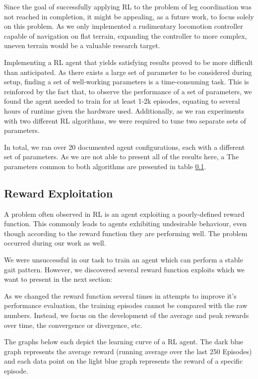 Since the goal of successfully applying RL to the problem of leg coordination was not reached in completion, it might be appealing, as a future work, to focus solely on this problem.
As we only implemented a rudimentary locomotion controller capable of navigation on flat terrain, expanding the controller to more complex, uneven terrain would be a valuable research target.

Implementing a RL agent that yields satisfying results proved to be more difficult than anticipated.
As there exists a large set of parameter to be considered during setup, finding a set of well-working parameters is a time-consuming task.
This is reinforced by the fact that, to observe the performance of a set of parameters, we found the agent needed to train for at least 1-2k episodes, equating to several hours of runtime given the hardware used.
Additionally, as we ran experiments with two different RL algorithms, we were required to tune two separate sets of parameters.

In total, we ran over 20 documented agent configurations, each with a different set of parameters.
As we are not able to present all of the results here, a 
The parameters common to both algorithms are presented in table \ref{}.

\subsection{Reward Exploitation}
A problem often observed in RL is an agent exploiting a poorly-defined reward function.
This commonly leads to agents exhibiting undesirable behaviour, even though according to the reward function they are performing well.
The problem occurred during our work as well.

We were unsuccessful in our task to train an agent which can perform a stable gait pattern.
However, we discovered several reward function exploits which we want to present in the next section:

As we changed the reward function several times in attempts to improve it's performance evaluation, the training episodes cannot be compared with the raw numbers.
Instead, we focus on the development of the average and peak rewards over time, the convergence or divergence, etc.


The graphs below each depict the learning curve of a RL agent. The dark blue graph represents the average reward (running average over the last 250 Episodes) and each data point on the light blue graph represents the reward of a specific episode.

